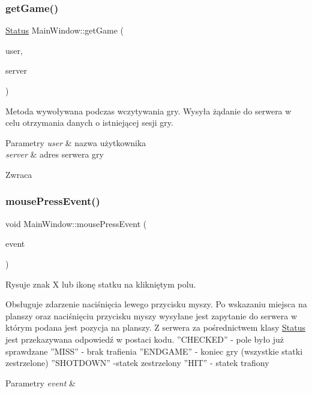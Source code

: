 \subsubsection{\texorpdfstring{getGame()}{getGame()}}
{\footnotesize\ttfamily \mbox{\hyperlink{classStatus}{Status}} Main\+Window\+::get\+Game (\begin{DoxyParamCaption}\item[{Q\+String}]{user,  }\item[{Q\+String}]{server }\end{DoxyParamCaption})}



Metoda wywoływana podczas wczytywania gry. Wysyła żądanie do serwera w celu otrzymania danych o istniejącej sesji gry. 


\begin{DoxyParams}{Parametry}
{\em user} & nazwa użytkownika \\
\hline
{\em server} & adres serwera gry \\
\hline
\end{DoxyParams}
\begin{DoxyReturn}{Zwraca}

\end{DoxyReturn}
\mbox{\label{classMainWindow_a2b5463ae209a03d1680b39c950dac8be}} 
\subsubsection{\texorpdfstring{mousePressEvent()}{mousePressEvent()}}
{\footnotesize\ttfamily void Main\+Window\+::mouse\+Press\+Event (\begin{DoxyParamCaption}\item[{Q\+Mouse\+Event $\ast$}]{event }\end{DoxyParamCaption})\hspace{0.3cm}{\ttfamily [protected]}}



Rysuje znak X lub ikonę statku na klikniętym polu. 

Obsługuje zdarzenie naciśnięcia lewego przycisku myszy. Po wskazaniu miejsca na planszy oraz naciśnięciu przycisku myszy wysyłane jest zapytanie do serwera w którym podana jest pozycja na planszy. Z serwera za pośrednictwem klasy \mbox{\hyperlink{classStatus}{Status}} jest przekazywana odpowiedź w postaci kodu. ”\+C\+H\+E\+C\+K\+E\+D” -\/ pole było już sprawdzane ”\+M\+I\+S\+S” -\/ brak trafienia ”\+E\+N\+D\+G\+A\+M\+E” -\/ koniec gry (wszystkie statki zestrzelone) ”\+S\+H\+O\+T\+D\+O\+W\+N” -\/statek zestrzelony ”\+H\+I\+T” -\/ statek trafiony 
\begin{DoxyParams}{Parametry}
{\em event} & \\
\hline
\end{DoxyParams}
\mbox{\label{classMainWindow_aebbc3ce8ecac3db6b5aba3b844fc3afb}} 
